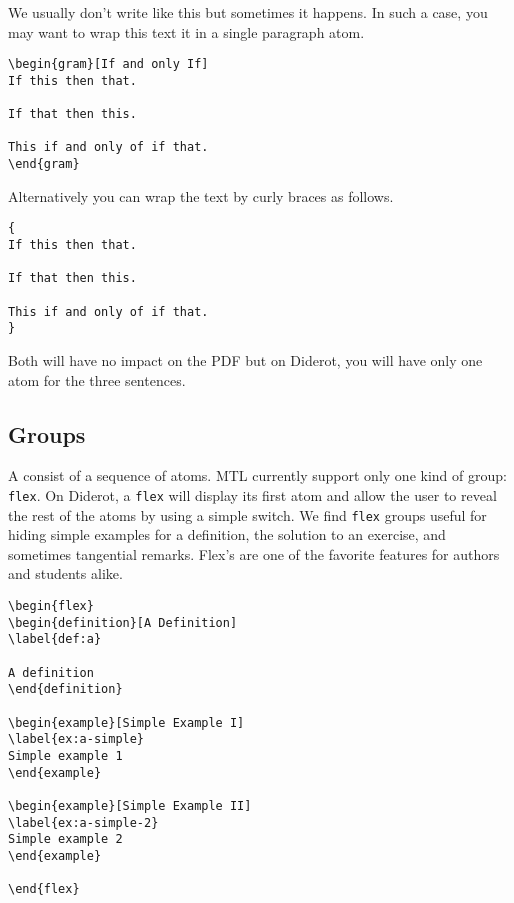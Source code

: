 We usually don't write like this but sometimes it happens.
%
In such a case, you may want to wrap this text it in a single paragraph atom.
%
\begin{lstlisting}
\begin{gram}[If and only If]
If this then that.

If that then this.

This if and only of if that.
\end{gram}
\end{lstlisting}

Alternatively you can wrap the text by curly braces as follows.
%
\begin{lstlisting}
{
If this then that.

If that then this.

This if and only of if that.
}
\end{lstlisting}
%
%
Both will have no impact on the PDF but on Diderot, you will have only one atom for the three sentences.


\subsection{Groups}
\label{sec:mtl::groups}

\begin{gram}[Group]
A  consist of a sequence of atoms.  MTL currently support only one kind of group: \lstinline`flex`.  On Diderot, a \lstinline`flex` will display its first atom and allow the user to reveal the rest of the atoms by using a simple switch.  We find \lstinline`flex` groups useful for hiding simple examples for a definition, the solution to an exercise, and sometimes tangential remarks.  Flex's are one of the favorite features for authors and students alike. 

\begin{lstlisting}
\begin{flex}
\begin{definition}[A Definition]
\label{def:a}

A definition
\end{definition}

\begin{example}[Simple Example I]
\label{ex:a-simple}
Simple example 1
\end{example}

\begin{example}[Simple Example II]
\label{ex:a-simple-2}
Simple example 2
\end{example}

\end{flex}
\end{lstlisting}
\end{gram}

